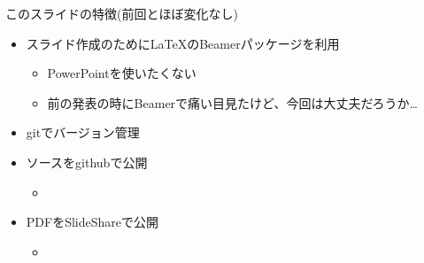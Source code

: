 \begin{frame}{このスライドの特徴(前回とほぼ変化なし)}
 \begin{itemize}
  \item スライド作成のために\LaTeX のBeamerパッケージを利用
        \begin{itemize}
         \item PowerPointを使いたくない
         \item 前の発表の時にBeamerで痛い目見たけど、今回は大丈夫だろうか…
        \end{itemize}
  \item gitでバージョン管理
  \item ソースをgithubで公開
        \begin{itemize}
         \item \href{https://github.com/sakabar/prml_titech_8-1_8-2}{}
        \end{itemize}
  \item PDFをSlideShareで公開
        \begin{itemize}
         \item \href{http://www.slideshare.net/takafumisakakibara75/slide-44207685}{}
        \end{itemize}
 \end{itemize}
\end{frame}

